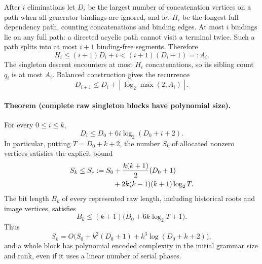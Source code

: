 After $i$ eliminations let $D_i$ be the largest number of concatenation
vertices on a path when all generator bindings are ignored, and let
$H_i$ be the longest full dependency path, counting concatenations and
binding edges. At most $i$ bindings lie on any full path: a directed
acyclic path cannot visit a terminal twice. Such a path splits into at
most $i+1$ binding-free segments. Therefore
\begin{equation}\label{eq:persistent-height}
 H_i\le(i+1)D_i+i < (i+1)(D_i+1)=:A_i.
\end{equation}
The singleton descent encounters at most $H_i$ concatenations, so its
sibling count $q_i$ is at most $A_i$. Balanced construction gives the
recurrence
\begin{equation}\label{eq:persistent-recurrence}
 D_{i+1}\le D_i+
       \left\lceil\log_2\max(2,A_i)\right\rceil.
\end{equation}

\paragraph{Theorem (complete raw singleton blocks have polynomial size).}
For every $0\le i\le k$,
\begin{equation}\label{eq:persistent-D}
 D_i\le D_0+6i\log_2(D_0+i+2).
\end{equation}
In particular, putting $T=D_0+k+2$, the number $S_k$ of allocated
nonzero vertices satisfies the explicit bound
\begin{align}\label{eq:persistent-S}
 S_k\le S_*:={}&S_0+\frac{k(k+1)}2(D_0+1)\notag\\
 &\quad+2k(k-1)(k+1)\log_2 T.
\end{align}
The bit length $B_k$ of every represented raw length, including historical
roots and image vertices, satisfies
\begin{equation}\label{eq:persistent-B}
 B_k\le(k+1)\bigl(D_0+6k\log_2 T+1\bigr).
\end{equation}
Thus
\[
 S_k=O\bigl(S_0+k^2(D_0+1)+k^3\log(D_0+k+2)\bigr),
\]
and a whole block has polynomial encoded complexity in the initial
grammar size and rank, even if it uses a linear number of serial phases.

